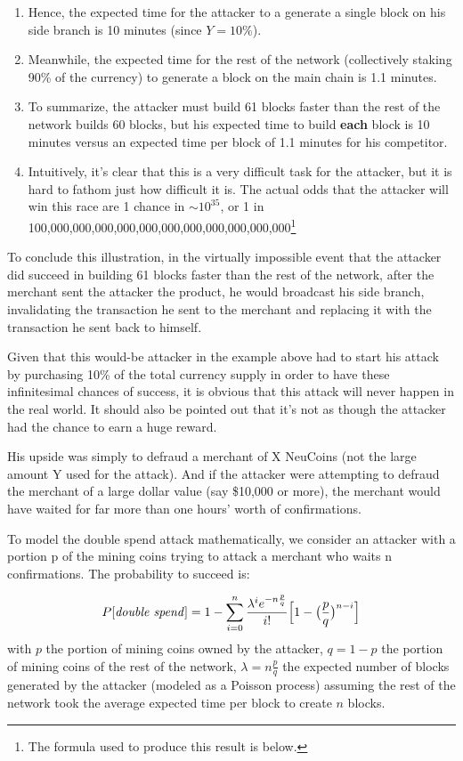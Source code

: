\documentclass[a4paper,11pt]{article}
\begin{document}
\begin{enumerate}
{\begin{enumerate}
	\item{Hence, the expected time for the attacker to a generate a single block on his side branch is 10 minutes (since $Y = 10\%$).}
	\item{Meanwhile, the expected time for the rest of the network (collectively staking 90\% of the currency) to generate a block on the main chain is 1.1 minutes.}
	\item{To summarize, the attacker must build 61 blocks faster than the rest of the network builds 60 blocks, but his expected time to build \textbf{each} block is 10 minutes versus an expected time per block of 1.1 minutes for his competitor.}
	\item{Intuitively, it's clear that this is a very difficult task for the attacker, but it is hard to fathom just how difficult it is. The actual odds that the attacker will win this race are 1 chance in $\sim10^{35}$, or 1 in 100,000,000,000,000,000,000,000,000,000,000,000\footnote{The formula used to produce this result is below.} 
}
	\end{enumerate}
\item{To conclude this illustration, in the virtually impossible event that the attacker did succeed in building 61 blocks faster than the rest of the network, after the merchant sent the attacker the product, he would broadcast his side branch, invalidating the transaction he sent to the merchant and replacing it with the transaction he sent back to himself.}
}
\end{enumerate}
  
Given that this would-be attacker in the example above had to start his attack by purchasing 10\% of the total currency supply in order to have these infinitesimal chances of success, it is obvious that this attack will never happen in the real world. It should also be pointed out that it's not as though the attacker had the chance to earn a huge reward. 

His upside was simply to defraud a merchant of X NeuCoins (not the large amount Y used for the attack). And if the attacker were attempting to defraud the merchant of a large dollar value (say \$10,000 or more), the merchant would have waited for far more than one hours' worth of confirmations.


To model the double spend attack mathematically\cite{nakamoto2008bitcoin}, we consider an attacker with a portion p of the mining coins trying to attack a merchant who waits n confirmations. The probability to succeed is:

 
$$ P[\text{\textit{double spend}}]= 1 - \sum\limits_{i=0}^n\frac{\lambda^{i}e^{-n\frac{p}{q}}}{i!} \Big[ 1- \big(\frac{p}{q}\big)^{n-i} \Big] $$
with $p$ the portion of mining coins owned by the attacker, $q=1-p$ the portion of mining coins of the rest of the network, $\lambda=n\frac{p}{q}$ the expected number of blocks generated by the attacker (modeled as a Poisson process) assuming the rest of the network took the average expected time per block to create $n$ blocks.
\end{document}
